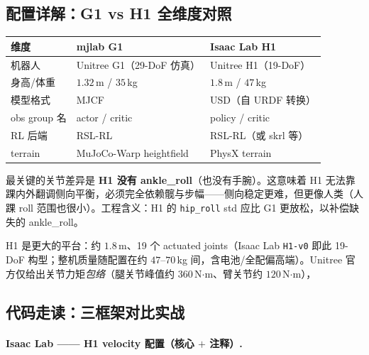 \subsection{配置详解：G1 vs H1 全维度对照}

\begin{center}
\small
\begin{tabular}{lll}
\hline
维度 & mjlab G1 & Isaac Lab H1 \\
\hline
机器人 & Unitree G1（29-DoF 仿真） & Unitree H1（19-DoF） \\
身高/体重 & $1.32$\,m / $35$\,kg & $1.8$\,m / $47$\,kg \\
模型格式 & MJCF & USD（自 URDF 转换） \\
obs group 名 & actor / critic & policy / critic \\
RL 后端 & RSL-RL & RSL-RL（或 skrl 等） \\
terrain & MuJoCo-Warp heightfield & PhysX terrain \\
\hline
\end{tabular}
\end{center}

最关键的关节差异是 \textbf{H1 没有 ankle\_roll}（也没有手腕）。这意味着 H1 无法靠踝内外翻调侧向平衡，必须完全依赖髋与步幅——侧向稳定更难，但更像人类（人踝 roll 范围也很小）。工程含义：H1 的 \texttt{hip\_roll} std 应比 G1 更放松，以补偿缺失的 ankle\_roll。

H1 是更大的平台：约 $1.8$\,m、19 个 actuated joints（Isaac Lab \texttt{H1-v0} 即此 19-DoF 构型；整机质量随配置在约 $47$--$70$\,kg 间，含电池/全配偏高端）。Unitree 官方仅给出关节力矩\emph{包络}（腿关节峰值约 $360$\,N$\cdot$m、臂关节约 $120$\,N$\cdot$m），

\subsection{代码走读：三框架对比实战}

\paragraph{Isaac Lab —— H1 velocity 配置（核心 $+$ 注释）.}

